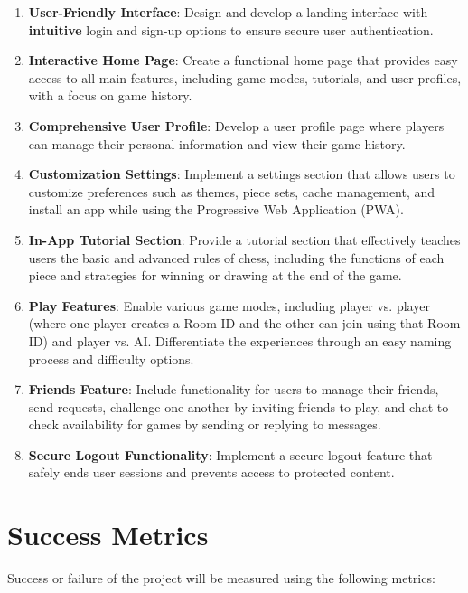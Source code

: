 \begin{enumerate}
    \item \textbf{User-Friendly Interface}: Design and develop a landing interface with \textbf{intuitive} login and sign-up options to ensure secure user authentication.
    \item \textbf{Interactive Home Page}: Create a functional home page that provides easy access to all main features, including game modes, tutorials, and user profiles, with a focus on game history.
    \item \textbf{Comprehensive User Profile}: Develop a user profile page where players can manage their personal information and view their game history.
    \item \textbf{Customization Settings}: Implement a settings section that allows users to customize preferences such as themes, piece sets, cache management, and install an app while using the Progressive Web Application (PWA).
    \item \textbf{In-App Tutorial Section}: Provide a tutorial section that effectively teaches users the basic and advanced rules of chess, including the functions of each piece and strategies for winning or drawing at the end of the game.
    \item \textbf{Play Features}: Enable various game modes, including player vs. player (where one player creates a Room ID and the other can join using that Room ID) and player vs. AI. Differentiate the experiences through an easy naming process and difficulty options.
    \item \textbf{Friends Feature}: Include functionality for users to manage their friends, send requests, challenge one another by inviting friends to play, and chat to check availability for games by sending or replying to messages.
    \item \textbf{Secure Logout Functionality}: Implement a secure logout feature that safely ends user sessions and prevents access to protected content.
\end{enumerate}

\section{Success Metrics}

Success or failure of the project will be measured using the following metrics:

